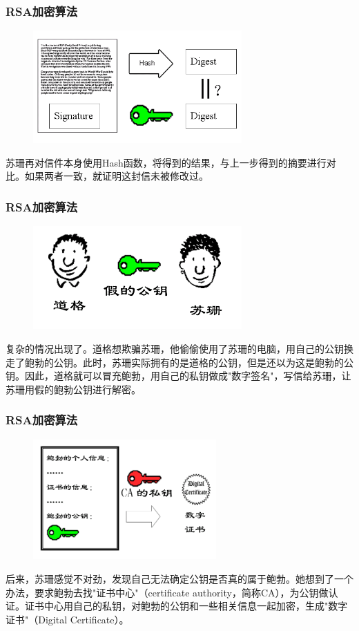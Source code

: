 \documentclass[slidestop,compress,mathserif]{beamer}
\begin{document}
\begin{frame}
  \transboxout
  \frametitle{RSA加密算法}
  \begin{center}
    \begin{figure}
      \includegraphics[width=8cm]{bg9}
    \end{figure}
    苏珊再对信件本身使用Hash函数，将得到的结果，与上一步得到的摘要进行对比。如果两者一致，就证明这封信未被修改过。
  \end{center}
\end{frame}

\begin{frame}
  \transboxout
  \frametitle{RSA加密算法}
  \begin{center}
    \begin{figure}
      \includegraphics[width=8cm]{bg10}
    \end{figure}
    复杂的情况出现了。道格想欺骗苏珊，他偷偷使用了苏珊的电脑，用自己的公钥换走了鲍勃的公钥。此时，苏珊实际拥有的是道格的公钥，但是还以为这是鲍勃的公钥。因此，道格就可以冒充鲍勃，用自己的私钥做成"数字签名"，写信给苏珊，让苏珊用假的鲍勃公钥进行解密。
  \end{center}
\end{frame}

\begin{frame}
  \transboxout
  \frametitle{RSA加密算法}
  \begin{center}
    \begin{figure}
      \includegraphics[width=7cm]{bg11}
    \end{figure}
    后来，苏珊感觉不对劲，发现自己无法确定公钥是否真的属于鲍勃。她想到了一个办法，要求鲍勃去找"证书中心"（certificate authority，简称CA），为公钥做认证。证书中心用自己的私钥，对鲍勃的公钥和一些相关信息一起加密，生成"数字证书"（Digital Certificate）。
  \end{center}
\end{frame}
\end{document}
